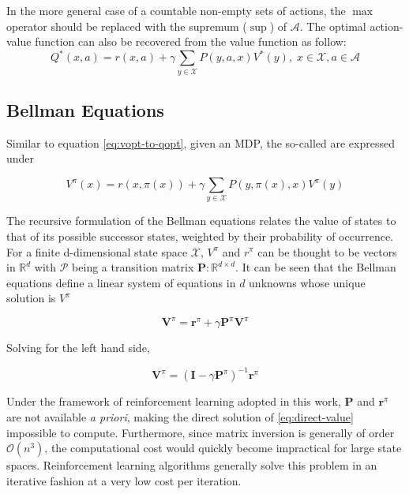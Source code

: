 In the more general case of a countable non-empty sets of actions, the $\max$
operator should be replaced with the supremum ($\sup$) of $\mathcal{A}$. The
optimal action-value function can also be recovered from the value function as
follow:
\begin{equation}
Q^*(x,a) = r(x,a) + \gamma \sum_{y \in \mathcal{X}} P(y, a, x) V^*(y), \; x \in
\mathcal{X}, a \in \mathcal{A} \label{eq:vopt-to-qopt}
\end{equation}

\subsection{Bellman Equations}
Similar to equation \ref{eq:vopt-to-qopt}, given an MDP, the  so-called 
 are expressed under

\begin{equation}
V^\pi(x) = r(x, \pi(x)) + \gamma \sum_{y \in \mathcal{X}} P(y, \pi(x), x) V^\pi(y)
\label{eq:bellman-equations}
\end{equation}

The recursive formulation of the Bellman equations relates the value of states
to that of its possible successor states, weighted by their probability of occurrence. For a finite d-dimensional state space $\mathcal{X}$, $V^\pi$ and
$r^\pi$ can be thought to be vectors in $\mathbb{R}^d$ with $\mathcal{P}$ being a
transition matrix $\mathbf{P}: \mathbb{R}^{d \times d}$. It can be seen that the
Bellman equations define a linear system of equations in
$d$ unknowns whose unique solution is $V^\pi$

\begin{equation}
\mathbf{V}^\pi = \mathbf{r}^\pi + \gamma \mathbf{P}^\pi \mathbf{V}^\pi
\end{equation}

Solving for the left hand side, 

\begin{equation}
\mathbf{V}^\pi = (\mathbf{I} - \gamma \mathbf{P}^\pi)^{-1} \mathbf{r}^\pi
\label{eq:direct-value}
\end{equation}

Under the framework of reinforcement learning adopted in this work,
$\mathbf{P}$ and $\mathbf{r}^\pi$ are not available \textit{a priori}, making the
direct solution of \ref{eq:direct-value} impossible to compute. Furthermore, since
matrix inversion is generally of order $\mathcal{O}(n^3)$, the computational
cost would quickly become impractical for large state spaces. Reinforcement learning algorithms generally solve this problem in an iterative fashion at a very low cost per iteration.

